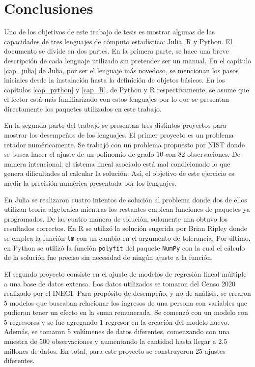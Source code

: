 \chapter{Conclusiones} \label{cap_conclusiones}
Uno de los objetivos de este trabajo de tesis es mostrar algunas de las capacidades de tres lenguajes de cómputo estadístico: \textsf{Julia}, \textsf{R} y \textsf{Python}. El documento se divide en dos partes. En la primera parte, se hace una breve descripción de cada lenguaje utilizado sin pretender ser un manual. En el capítulo \ref{cap_julia} de \textsf{Julia}, por ser el lenguaje más novedoso, se mencionan los pasos iniciales desde la instalación hasta la definición de objetos básicos. En los capítulos \ref{cap_python} y \ref{cap_R}, de \textsf{Python} y \textsf{R} respectivamente, se asume que el lector está más familiarizado con estos lenguajes por lo que se presentan directamente los paquetes utilizados en este trabajo.  

En la segunda parte del trabajo se presentan tres distintos proyectos para mostrar los desempeños de los lenguajes. El primer proyecto es un problema retador numéricamente. Se trabajó con un problema propuesto por NIST donde se busca hacer el ajuste de un polinomio de grado 10 con 82 observaciones. De manera intencional, el sistema lineal asociado está mal condicionado lo que genera dificultades al calcular la solución. Así, el objetivo de este ejercicio es medir la precisión numérica presentada por los lenguajes. 

En \textsf{Julia} se realizaron cuatro intentos de solución al problema donde dos de ellos utilizan teoría algebraica mientras los restantes emplean funciones de paquetes ya programados. De las cuatro manera de solución, solamente una obtuvo los resultados correctos. En \textsf{R} se utilizó la solución sugerida por Brian Ripley donde se emplea la función \texttt{lm} con un cambio en el argumento de tolerancia. Por último, en \textsf{Python} se utilizó la función \texttt{polyfit} del paquete \texttt{NumPy} con la cual el cálculo de la solución fue preciso sin necesidad de ningún ajuste a la función. 

El segundo proyecto consiste en el ajuste de modelos de regresión lineal múltiple a una base de datos extensa. Los datos utilizados se tomaron del Censo 2020 realizado por el INEGI. Para propósito de desempeño, y no de análisis, se crearon 5 modelos que buscaban relacionar los ingresos de una persona con variables que pudieran tener un efecto en la suma remunerada. Se comenzó con un modelo con 5 regresores y se fue agregando 1 regresor en la creación del modelo nuevo. Además, se tomaron 5 volúmenes de datos diferentes, comenzando con una muestra de 500 observaciones y aumentando la cantidad hasta llegar a 2.5 millones de datos. En total, para este proyecto se construyeron 25 ajustes diferentes. 

